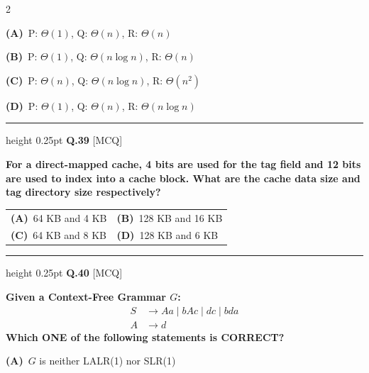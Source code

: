 \documentclass[a4paper,10pt,twoside]{article}
\begin{document}
\begin{multicols}{2}
\par\vspace{2pt}\noindent
\textbf{(A)}~P: $\Theta(1)$, Q: $\Theta(n)$, R: $\Theta(n)$\par\vspace{2pt}\noindent
\textbf{(B)}~P: $\Theta(1)$, Q: $\Theta(n\log n)$, R: $\Theta(n)$\par\vspace{2pt}\noindent
\textbf{(C)}~P: $\Theta(n)$, Q: $\Theta(n\log n)$, R: $\Theta(n^2)$\par\vspace{2pt}\noindent
\textbf{(D)}~P: $\Theta(1)$, Q: $\Theta(n)$, R: $\Theta(n\log n)$
\par\vspace{6pt}\hrule height 0.25pt\vspace{6pt}
\noindent\textbf{Q.39} \hfill {\footnotesize\textsf{[MCQ]}}
\par\vspace{2pt}
{\bfseries For a direct-mapped cache, 4 bits are used for the tag field and 12 bits are used to index into a cache block. What are the cache data size and tag directory size respectively? \par}
\par\vspace{2pt}\noindent
\begin{tabular*}{\columnwidth}{@{\extracolsep{\fill}}p{}p{}@{}}
\textbf{(A)}~64 KB and 4 KB & \textbf{(B)}~128 KB and 16 KB \\
\addlinespace[2pt]
\textbf{(C)}~64 KB and 8 KB & \textbf{(D)}~128 KB and 6 KB
\end{tabular*}
\par\vspace{6pt}\hrule height 0.25pt\vspace{6pt}
\noindent\textbf{Q.40} \hfill {\footnotesize\textsf{[MCQ]}}
\par\vspace{2pt}
{\bfseries Given a Context-Free Grammar $G$:
$$\begin{aligned} S &\to Aa \mid bAc \mid dc \mid bda \\ A &\to d \end{aligned}$$
Which ONE of the following statements is CORRECT? \par}
\par\vspace{2pt}\noindent
\textbf{(A)}~$G$ is neither LALR(1) nor SLR(1)\par\vspace{2pt}\noindent

\end{multicols}
\end{document}
